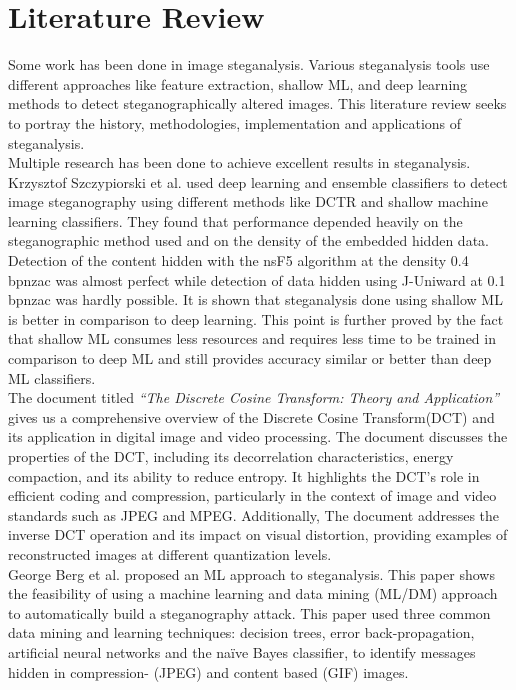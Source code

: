 \chapter{Literature Review}  \sloppy
Some work has been done in image steganalysis. Various steganalysis tools use different approaches like feature extraction, shallow ML, and deep learning methods to detect steganographically altered images. This literature review seeks to portray the history, methodologies, implementation and applications of steganalysis.\\
Multiple research has been done to achieve excellent results in steganalysis. Krzysztof Szczypiorski et al.\cite{1} used deep learning and ensemble classifiers to detect image steganography using different methods like DCTR and shallow machine learning classifiers. They found that performance depended heavily on the steganographic method used and on the density of the embedded hidden data. Detection of the content hidden with the nsF5 algorithm at the density 0.4 bpnzac was almost perfect while detection of data hidden using J-Uniward at 0.1 bpnzac was hardly possible. It is shown that steganalysis done using shallow ML is better in comparison to deep learning. This point is further proved by the fact that shallow ML consumes less resources and requires less time to be trained in comparison to deep ML and still provides accuracy similar or better than deep ML classifiers. \\
The document titled \textit{``The Discrete Cosine Transform: Theory and Application''}\cite{4} gives us a comprehensive overview of the Discrete Cosine Transform(DCT) and its application in digital image and video processing. The document discusses the properties of the DCT, including its decorrelation characteristics, energy compaction, and its ability to reduce entropy. It highlights the DCT's role in efficient coding and compression, particularly in the context of image and video standards such as JPEG and MPEG. Additionally, The document addresses the inverse DCT operation and its impact on visual distortion, providing examples of reconstructed images at different quantization levels.\\
George Berg et al.\cite{2} proposed an ML approach to steganalysis. This paper shows the feasibility of using a machine learning and data mining (ML/DM) approach to automatically build a steganography attack. This paper used three common data mining and learning techniques: decision trees, error back-propagation, artificial neural networks and the naïve Bayes classifier, to identify messages hidden in compression- (JPEG) and content based (GIF) images.\\
